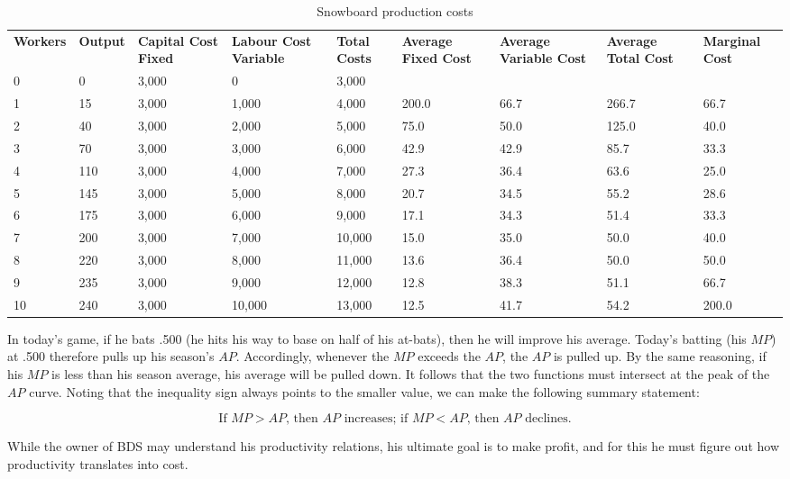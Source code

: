 \begin{table}[H]
\begin{center}
\begin{tabu} to \linewidth {|X[1,c]X[0.9,c]X[1,c]X[1,c]X[0.9,c]X[1,c]X[1,c]X[1,c]X[1.1,c]|} \hline 
{}	\textbf{Workers} & \textbf{Output} & \textbf{Capital Cost Fixed} & \textbf{Labour Cost Variable} & \textbf{Total Costs} & \textbf{Average Fixed Cost} & \textbf{Average Variable Cost} & \textbf{Average Total Cost} & \textbf{Marginal Cost} \\[0.25em]
						0 & 0 & 3,000 & 0 & 3,000 &  &  &  &  \\
	1 & 15 & 3,000 & 1,000 & 4,000 & 200.0 & 66.7 & 266.7 & 66.7 \\
						2 & 40 & 3,000 & 2,000 & 5,000 & 75.0 & 50.0 & 125.0 & 40.0 \\ 
	3 & 70 & 3,000 & 3,000 & 6,000 & 42.9 & 42.9 & 85.7 & 33.3 \\ 
						4 & 110 & 3,000 & 4,000 & 7,000 & 27.3 & 36.4 & 63.6 & 25.0 \\ 
	5 & 145 & 3,000 & 5,000 & 8,000 & 20.7 & 34.5 & 55.2 & 28.6 \\
						6 & 175 & 3,000 & 6,000 & 9,000 & 17.1 & 34.3 & 51.4 & 33.3 \\ 
	7 & 200 & 3,000 & 7,000 & 10,000 & 15.0 & 35.0 & 50.0 & 40.0 \\
						8 & 220 & 3,000 & 8,000 & 11,000 & 13.6 & 36.4 & 50.0 & 50.0 \\
	9 & 235 & 3,000 & 9,000 & 12,000 & 12.8 & 38.3 & 51.1 & 66.7 \\ 
						10 & 240 & 3,000 & 10,000 & 13,000 & 12.5 & 41.7 & 54.2 & 200.0 \\ \hline 
\end{tabu}
\end{center}
\caption{Snowboard production costs \label{table:snowprodcost}}
\end{table}

In today's game, if he bats .500 (he hits his way to base on half of his at-bats), then he will improve his average. Today's batting (his $MP$) at .500 therefore pulls up his season's $AP$. Accordingly, whenever the $MP$ exceeds the $AP$, the $AP$ is pulled up. By the same reasoning, if his $MP$ is less than his season average, his average will be pulled down. It follows that the two functions must intersect at the peak of the $AP$ curve. Noting that the inequality sign always points to the smaller value, we can make the following summary statement:

\begin{equation*}
\text{If }MP > AP\text{, then }AP\text{ increases; if }MP < AP\text{, then }AP\text{ declines.}
\end{equation*}

While the owner of BDS may understand his productivity relations, his ultimate goal is to make profit, and for this he must figure out how productivity translates into cost. 